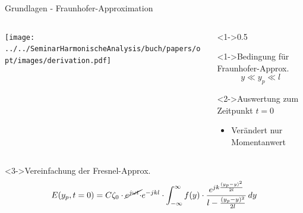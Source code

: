 \begin{frame}{Grundlagen - Fraunhofer-Approximation}
    \begin{columns}
        \begin{column}{0.5\textwidth}
            \centering
            \texttt{[image: ../../SeminarHarmonischeAnalysis/buch/papers/opt/images/derivation.pdf]}
        \end{column}

        \begin{column}<1->{0.5\textwidth}
            \begin{alertblock}<1->{Bedingung für Fraunhofer-Approx.}
                \begin{equation*}
                    y
                    \ll
                    y_p
                    \ll
                    l
                \end{equation*}
            \end{alertblock}
            \begin{block}<2->{Auswertung zum Zeitpunkt $t=0$}
                \begin{itemize}
                    \item Verändert nur Momentanwert
                \end{itemize}
            \end{block}
        \end{column}
    \end{columns}
    \begin{block}<3->{Vereinfachung der Fresnel-Approx.}
        \begin{equation*}
            E(y_p, t=0)
            =
            C\zeta_0 \cdot \cancel{e^{j\omega t} \cdot} e^{-jkl} \cdot \int_{-\infty}^{\infty}f(y)\cdot\frac{e^{jk\frac{(y_p-y)^2}{2l}}}{l - \frac{(y_p-y)^2}{2l}} \,dy
        \end{equation*}
    \end{block}
\end{frame}
